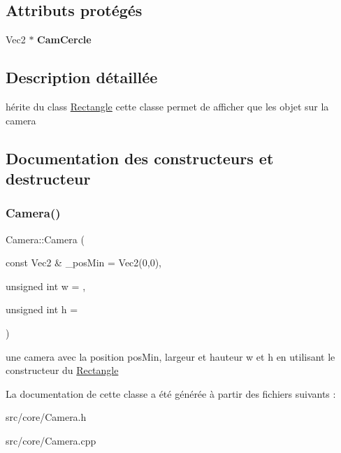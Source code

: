 \subsection*{Attributs protégés}
\begin{DoxyCompactItemize}
\item 
\mbox{\label{class_camera_a78d509eb873c55a2f530c7a2db318359}} 
Vec2 $\ast$ {\bfseries Cam\+Cercle}
\end{DoxyCompactItemize}


\subsection{Description détaillée}
hérite du class \mbox{\hyperlink{class_rectangle}{Rectangle}} cette classe permet de afficher que les objet sur la camera 

\subsection{Documentation des constructeurs et destructeur}
\mbox{\label{class_camera_ab01f0ff58d8ebd0ffbe27f62a9a9e3ac}} 
\subsubsection{\texorpdfstring{Camera()}{Camera()}}
{\footnotesize\ttfamily Camera\+::\+Camera (\begin{DoxyParamCaption}\item[{const Vec2 \&}]{\+\_\+pos\+Min = {\ttfamily Vec2(0,0)},  }\item[{unsigned int}]{w = {},  }\item[{unsigned int}]{h = {} }\end{DoxyParamCaption})\hspace{0.3cm}{\ttfamily [inline]}}

une camera avec la position pos\+Min, largeur et hauteur w et h en utilisant le constructeur du \mbox{\hyperlink{class_rectangle}{Rectangle}} 

La documentation de cette classe a été générée à partir des fichiers suivants \+:\begin{DoxyCompactItemize}
\item 
src/core/Camera.\+h\item 
src/core/Camera.\+cpp\end{DoxyCompactItemize}
